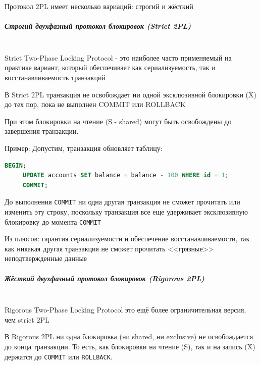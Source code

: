  Протокол 2PL имеет несколько вариаций: строгий и жёсткий
 
 \subparagraph{Строгий двухфазный протокол блокировок (Strict 2PL)} ~\\

 Strict Two-Phase Locking Protocol - это наиболее часто применяемый на практике вариант, который обеспечивает как сериализуемость, так и восстанавливаемость транзакций
 
 \begin{grayquote}
     В Strict 2PL транзакция не освобождает ни одной эксклюзивной блокировки (X) до тех пор, пока не выполнен COMMIT или ROLLBACK \autocite{Silberschatz}
 \end{grayquote}
 
 При этом блокировки на чтение (S - shared) могут быть освобождены до завершения транзакции.
 
 Пример:
 Допустим, транзакция обновляет таблицу:
 \begin{lstlisting}[language=SQL]
     BEGIN;
     UPDATE accounts SET balance = balance - 100 WHERE id = 1;
     COMMIT;    
 \end{lstlisting}

 До выполнения \texttt{COMMIT} ни одна другая транзакция не сможет прочитать или изменить эту строку, поскольку транзакция все еще удерживает эксклюзивную блокировку до момента \texttt{COMMIT}
 
 Из плюсов: гарантия сериализуемости и обеспечение восстанавливаемости, так как никакая другая транзакция не сможет прочитать <<грязные>> неподтвержденные данные
 
 \subparagraph{Жёсткий двухфазный протокол блокировок (Rigorous 2PL)} ~\\

 Rigorous Two-Phase Locking Protocol это ещё более ограничительная версия, чем strict 2PL \autocite{Silberschatz}
 \begin{grayquote}
     В Rigorous 2PL ни одна блокировка (ни shared, ни exclusive) не освобождается до конца транзакции. 
     То есть, как блокировки на чтение (S), так и на запись (X) держатся до \texttt{COMMIT} или \texttt{ROLLBACK}. \autocite{Silberschatz}
 \end{grayquote}
 
